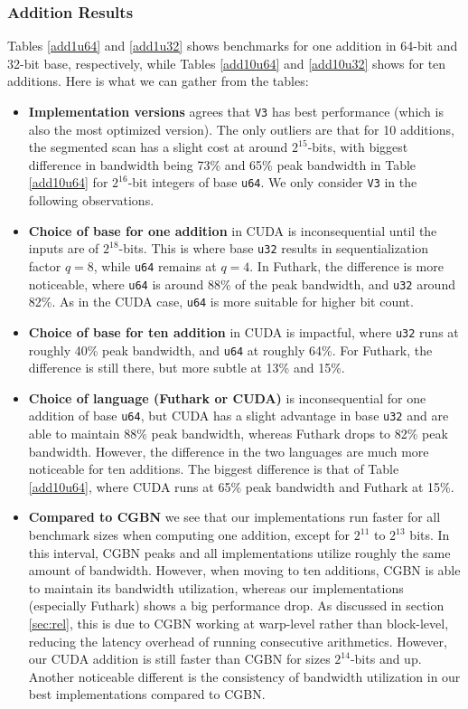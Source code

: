 \subsubsection{Addition Results}
\label{subsubsec:addres}

Tables \ref{add1u64} and \ref{add1u32} shows benchmarks for one addition in
64-bit and 32-bit base, respectively, while Tables \ref{add10u64} and
\ref{add10u32} shows for ten additions. Here is what we can gather from the
tables:
\begin{itemize}
  \renewcommand\labelitemi{--}
\item \textbf{Implementation versions} agrees that \texttt{V3} has best
  performance (which is also the most optimized version). The only outliers are
  that for 10 additions, the segmented scan has a slight cost at around
  $2^{15}$-bits, with biggest difference in bandwidth being 73\% and 65\% peak
  bandwidth in Table \ref{add10u64} for $2^{16}$-bit integers of base
  \texttt{u64}. We only consider \texttt{V3} in the following observations.
\item \textbf{Choice of base for one addition} in CUDA is inconsequential until
  the inputs are of $2^{18}$-bits. This is where base \texttt{u32} results in
  sequentialization factor $q=8$, while \texttt{u64} remains at $q = 4$. In
  Futhark, the difference is more noticeable, where \texttt{u64} is around 88\%
  of the peak bandwidth, and \texttt{u32} around 82\%. As in the CUDA case,
  \texttt{u64} is more suitable for higher bit count.
\item \textbf{Choice of base for ten addition} in CUDA is impactful, where
  \texttt{u32} runs at roughly 40\% peak bandwidth, and \texttt{u64} at roughly
  64\%. For Futhark, the difference is still there, but more subtle at 13\% and
  15\%.
\item \textbf{Choice of language (Futhark or CUDA)} is inconsequential for one
  addition of base \texttt{u64}, but CUDA has a slight advantage in base
  \texttt{u32} and are able to maintain 88\% peak bandwidth, whereas Futhark
  drops to 82\% peak bandwidth. However, the difference in the two languages are
  much more noticeable for ten additions. The biggest difference is that of
  Table \ref{add10u64}, where CUDA runs at 65\% peak bandwidth and Futhark at
  15\%.
\item \textbf{Compared to CGBN} we see that our implementations run faster for
  all benchmark sizes when computing one addition, except for $2^{11}$ to
  $2^{13}$ bits. In this interval, CGBN peaks and all implementations utilize
  roughly the same amount of bandwidth. However, when moving to ten additions,
  CGBN is able to maintain its bandwidth utilization, whereas our
  implementations (especially Futhark) shows a big performance drop. As
  discussed in section \ref{sec:rel}, this is due to CGBN working at warp-level
  rather than block-level, reducing the latency overhead of running consecutive
  arithmetics. However, our CUDA addition is still faster than CGBN for sizes
  $2^{14}$-bits and up. Another noticeable different is the consistency of
  bandwidth utilization in our best implementations compared to CGBN.
\end{itemize}

